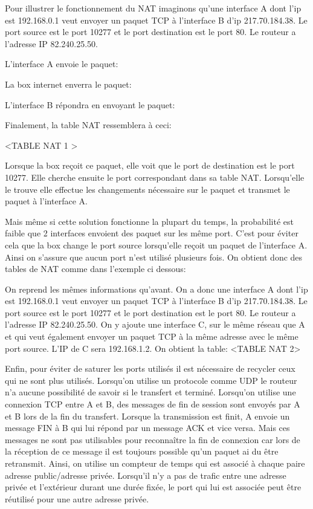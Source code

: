 Pour illustrer le fonctionnement du NAT imaginons qu'une interface A dont l'ip
est 192.168.0.1 veut envoyer un paquet TCP à l'interface B d'ip 217.70.184.38.
Le port source est le port 10277 et le port destination est le port 80. Le
routeur a l'adresse IP  82.240.25.50.

L'interface A envoie le paquet:

La box internet enverra le paquet:

L'interface B répondra en envoyant le paquet:

Finalement, la table NAT ressemblera à ceci:

<TABLE NAT 1 > 

Lorsque la box reçoit ce paquet, elle voit que le port de destination est le
port 10277. Elle cherche ensuite le port correspondant dans sa table NAT.
Lorsqu'elle le trouve elle effectue les changements nécessaire sur le paquet et
transmet le paquet à l'interface A.

Mais même si cette solution fonctionne la plupart du temps, la probabilité est
faible que 2 interfaces envoient des paquet sur les même port. C'est pour
éviter cela que la box change le port source lorsqu'elle reçoit un paquet de
l'interface A. Ainsi on s'assure que aucun port n'est utilisé plusieurs fois.
On obtient donc des tables de NAT comme dans l'exemple ci dessous:

On reprend les mêmes informations qu'avant. On a donc une interface A dont l'ip
est 192.168.0.1 veut envoyer un paquet TCP à l'interface B d'ip 217.70.184.38.
Le port source est le port 10277 et le port destination est le port 80. Le
routeur a l'adresse IP  82.240.25.50.
On y ajoute une interface C, sur le même réseau que A et qui veut également
envoyer un paquet TCP à la même adresse avec le même port source. L'IP de C
sera 192.168.1.2.
On obtient la table:
<TABLE NAT 2>

Enfin, pour éviter de saturer les ports utilisés il est nécessaire de recycler
 ceux qui ne sont plus utilisés. Lorsqu'on utilise un protocole comme UDP le
routeur n'a aucune possibilité de savoir si le transfert et terminé. Lorsqu'on
utilise une connexion TCP entre A et B, des messages de fin de session sont
envoyés par A et B lors de la fin du transfert. Lorsque la transmission est
finit, A envoie un message FIN à B qui lui répond par un message ACK et vice
versa. Mais ces messages ne sont pas utilisables pour reconnaître la fin de
connexion car lors de la réception de ce message il est toujours possible qu'un
paquet ai du être retransmit. Ainsi, on utilise un compteur de temps qui est
associé à chaque paire adresse public/adresse privée. Lorsqu'il n'y a pas de
trafic entre une adresse privée et l'extérieur durant une durée fixée, le port
qui lui est associée peut être réutilisé pour une autre adresse privée.


